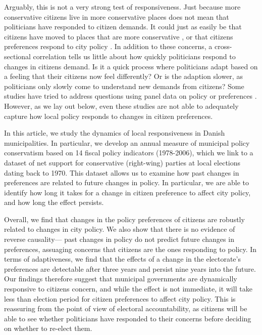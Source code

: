\documentclass[a4paper,12pt]{article}
\begin{document}
Arguably, this is not a very strong test of responsiveness. Just because more conservative citizens live in more conservative places does not mean that politicians have responded to citizen demands. It could just as easily be that citizens have moved to places that are more conservative \cite{tiebout1956pure}, or that citizens preferences respond to city policy \cite{slothuus2010can,broockman2017causal}. In addition to these concerns, a cross-sectional correlation tells us little about how quickly politicians respond to changes in citizens demand. Is it a quick process where politicians adapt based on a feeling that their citizens now feel differently? Or is the adaption slower, as politicians only slowly come to understand new demands from citizens? Some studies have tried to address questions using panel data on policy or preferences \citep[see][]{einstein2016pushing,sances2017voters}. However, as we lay out below, even these studies are not able to adequately capture how local policy responds to changes in citizen preferences. 

In this article, we study the dynamics of local responsiveness in Danish municipalities. In particular, we develop an annual measure of municipal policy conservatism based on 14 fiscal policy indicators (1978-2006), which we link to a dataset of net support for conservative (right-wing) parties at local elections dating back to 1970.  This dataset allows us to examine how past changes in preferences are related to future changes in policy. In particular, we are able to identify how long it takes for a change in citizen preference to affect city policy, and how long the effect persists.

Overall, we find that changes in the policy preferences of citizens are robustly related to changes in city policy. We also show that there is no evidence of reverse causality--- past changes in policy do not predict future changes in preferences, assuaging concerns that citizens are the ones responding to policy. In terms of adaptiveness, we find that the effects of a change in the electorate's preferences are detectable after three years and persist nine years into the future. Our findings therefore suggest that municipal governments are dynamically responsive to citizens concern, and while the effect is not immediate, it will take less than election period for citizen preferences to affect city policy. This is reassuring from the point of view of electoral accountability, as citizens will be able to see whether politicians have responded to their concerns before deciding on whether to re-elect them.
\end{document}
